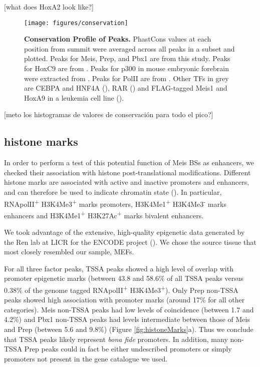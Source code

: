 [what does HoxA2 look like?] 

\begin{figure}[]
  
  \centering
  \label{fig:conservation}
  \texttt{[image: figures/conservation]}
  \caption[Conservation Profile of Peaks]{\textbf{Conservation Profile of Peaks.} PhastCons values at each position from summit were averaged across all peaks in a subset and plotted. Peaks for Meis, Prep, and Pbx1 are from this study. Peaks for HoxC9 are from \cite{Jung2010}. Peaks for p300 in mouse embryonic forebrain were extracted from \cite{Blow2010}. Peaks for PolII are from \cite{Mahony2011}. Other TFs in grey are CEBPA and HNF4A (\cite{Schmidt2010}), RAR (\cite{Mahony2011}) and FLAG-tagged Meis1 and HoxA9 in a leukemia cell line (\cite{Huang2012}).}
\end{figure}


[meto los histogramas de valores de conservación para todo el pico?]

\subsection{histone marks}

In order to perform a test of this potential function of Meis \acp{BS} as enhancers, we checked their association with histone post-translational modifications. Different histone marks are associated with active and inactive promoters and enhancers, and can therefore be used to indicate chromatin state (\cite{Mikkelsen2007}). In particular, RNApolII\textsuperscript{+} H3K4Me3\textsuperscript{+} marks promoters,  H3K4Me1\textsuperscript{+} H3K4Me3\textsuperscript{-} marks enhancers and H3K4Me1\textsuperscript{+} H3K27Ac\textsuperscript{+} marks bivalent enhancers. 

We took advantage of the extensive, high-quality epigenetic data generated by the Ren lab at LICR for the ENCODE project (\cite{Shen2012}). We chose the source tissue that most closely resembled our sample, \acp{MEF}. 

For all three factor peaks, \ac{TSSA} peaks showed a high level of overlap with promoter epigenetic marks (between 43.8 and 58.6\% of all \ac{TSSA} peaks versus 0.38\% of the genome tagged RNApolII\textsuperscript{+} H3K4Me3\textsuperscript{+}). Only Prep non-\ac{TSSA} peaks showed high association with promoter marks (around 17\% for all other categories). Meis non-\ac{TSSA} peaks had low levels of coincidence (between 1.7 and 4.2\%) and Pbx1 non-\ac{TSSA} peaks had levels intermediate between those of Meis and Prep (between 5.6 and 9.8\%) (Figure \ref{fig:histoneMarks}a). Thus we conclude that \ac{TSSA} peaks likely represent \textit{bona fide} promoters. In addition, many non-\ac{TSSA} Prep peaks could in fact be either undescribed promoters or simply promoters not present in the gene catalogue we used.

